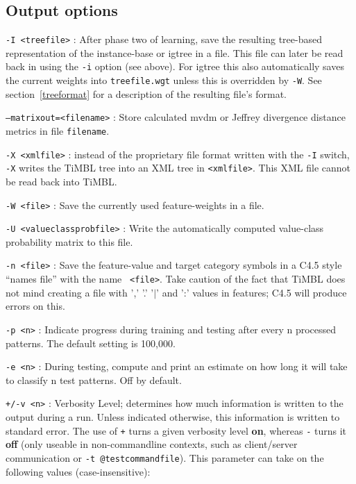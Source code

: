 \documentclass{report}
\begin{document}
\subsection{Output options}

\begin{description}

\item {\tt -I <treefile>} : After phase two of learning, save
  the resulting tree-based representation of the instance-base or {\sc
    igtree} in a file. This file can later be read back in using the
  {\tt -i} option (see above). For {\sc igtree} this also automatically
  saves the current weights into {\tt treefile.wgt} unless this is
  overridden by {\tt -W}.
  See section~\ref{treeformat} for a description of the resulting file's format.

\item {\tt --matrixout=<filename>} : Store calculated {\sc mvdm} or
  Jeffrey divergence distance metrics in file {\tt filename}.

\item {\tt -X <xmlfile>} : instead of the proprietary file format
  written with the {\tt -I} switch, {\tt -X} writes the TiMBL tree
  into an XML tree in {\tt <xmlfile>}. This XML file cannot be read
  back into TiMBL.

\item {\tt -W <file>} : Save the currently used feature-weights in a
file.

\item {\tt -U <valueclassprobfile>} : Write the automatically computed
value-class probability matrix to this file.

\item {\tt -n <file>} : Save the feature-value and target category
symbols in a C4.5 style ``names file'' with the name {\tt
<file>}. Take caution of the fact that TiMBL does not mind creating a
file with ',' '.' '$|$' and ':' values in features; C4.5 will produce errors on this.

\item {\tt -p <n>} : Indicate progress during training and testing
after every n processed patterns. The default setting is 100,000.

\item {\tt -e <n>} : During testing, compute and print an estimate on
how long it will take to classify n test patterns. Off by
default.

\item {\tt +/-v <n>} : Verbosity Level; determines how much
information is written to the output during a run. Unless indicated
otherwise, this information is written to standard error. The use of
{\tt +} turns a given verbosity level {\bf on}, whereas {\tt -} turns
it {\bf off} (only useable in non-commandline contexts, such as
client/server communication or {\tt -t @testcommandfile}). This
parameter can take on the following values (case-insensitive):


\end{description}
\end{document}

